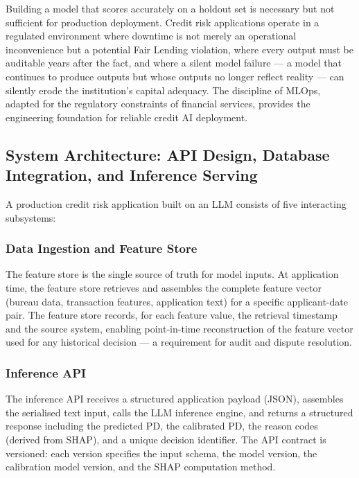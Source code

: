 \begin{context}

Building a model that scores accurately on a holdout set is necessary but not sufficient for production deployment. Credit risk applications operate in a regulated environment where downtime is not merely an operational inconvenience but a potential Fair Lending violation, where every output must be auditable years after the fact, and where a silent model failure --- a model that continues to produce outputs but whose outputs no longer reflect reality --- can silently erode the institution's capital adequacy. The discipline of MLOps, adapted for the regulatory constraints of financial services, provides the engineering foundation for reliable credit AI deployment.

\subsection{System Architecture: API Design, Database Integration, and Inference Serving}
\label{subsec:system-arch}

A production credit risk application built on an LLM consists of five interacting subsystems:

\subsubsection*{Data Ingestion and Feature Store}

The feature store is the single source of truth for model inputs. At application time, the feature store retrieves and assembles the complete feature vector (bureau data, transaction features, application text) for a specific applicant-date pair. The feature store records, for each feature value, the retrieval timestamp and the source system, enabling point-in-time reconstruction of the feature vector used for any historical decision --- a requirement for audit and dispute resolution.

\subsubsection*{Inference API}

The inference API receives a structured application payload (JSON), assembles the serialised text input, calls the LLM inference engine, and returns a structured response including the predicted PD, the calibrated PD, the reason codes (derived from SHAP), and a unique decision identifier. The API contract is versioned: each version specifies the input schema, the model version, the calibration model version, and the SHAP computation method.


\end{context}
